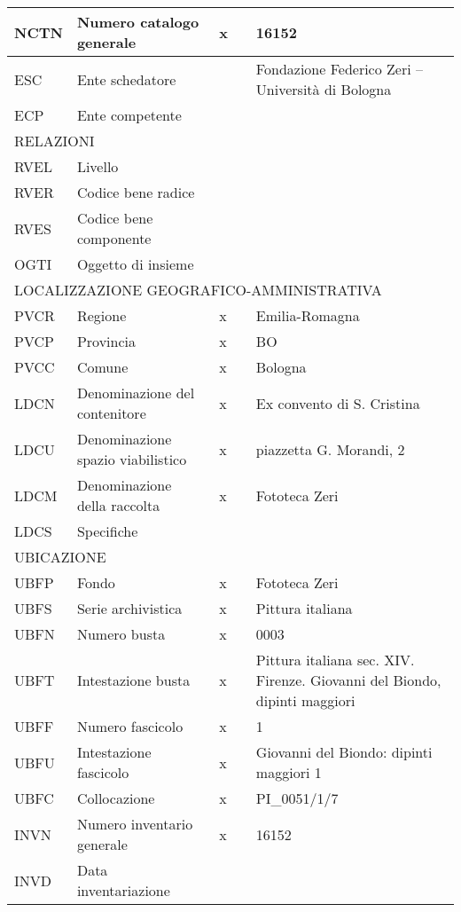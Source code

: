 \begin{center}
\begin{longtable}{ | p{1cm} | p{4cm} | p{.6cm} | p{.6cm} | p{5cm} | }
  NCTN & Numero catalogo generale & x &  & 16152 \\ \hline
  ESC & Ente schedatore &  &  & Fondazione Federico Zeri – Università di Bologna \\ \hline
  ECP & Ente competente &  &  &  \\ \hline
  \multicolumn{5}{|l|}{\cellcolor{lightcyan}RELAZIONI}\\ \hline
  RVEL & Livello &  &  &  \\ \hline
  RVER & Codice bene radice &  &  &  \\ \hline
  RVES & Codice bene componente &  &  &  \\ \hline
  OGTI & Oggetto di insieme &  &  &  \\ \hline
  \multicolumn{5}{|l|}{\cellcolor{lightcyan}LOCALIZZAZIONE GEOGRAFICO-AMMINISTRATIVA}\\ \hline
  PVCR & Regione & x &  & Emilia-Romagna \\ \hline
  PVCP & Provincia & x &  & BO \\ \hline
  PVCC & Comune & x &  & Bologna \\ \hline
  LDCN & Denominazione del contenitore & x &  & Ex convento di S. Cristina \\ \hline
  LDCU & Denominazione spazio viabilistico & x &  & piazzetta G. Morandi, 2 \\ \hline
  LDCM & Denominazione della raccolta & x &  & Fototeca Zeri \\ \hline
  LDCS & Specifiche &  &  &  \\ \hline
  \multicolumn{5}{|l|}{\cellcolor{lightcyan}UBICAZIONE}\\ \hline
  UBFP & Fondo & x &  & Fototeca Zeri \\ \hline
  UBFS & Serie archivistica & x &  & Pittura italiana \\ \hline
  UBFN & Numero busta & x &  & 0003 \\ \hline
  UBFT & Intestazione busta & x &  & Pittura italiana sec. XIV. Firenze. Giovanni del Biondo, dipinti maggiori \\ \hline
  UBFF & Numero fascicolo & x &  & 1 \\ \hline
  UBFU & Intestazione fascicolo & x &  & Giovanni del Biondo: dipinti maggiori 1 \\ \hline
  UBFC & Collocazione & x &  & PI\_0051/1/7 \\ \hline
  INVN & Numero inventario generale & x &  & 16152 \\ \hline
  INVD & Data inventariazione &  &  &  \\ \hline

\end{longtable}
\end{center}
